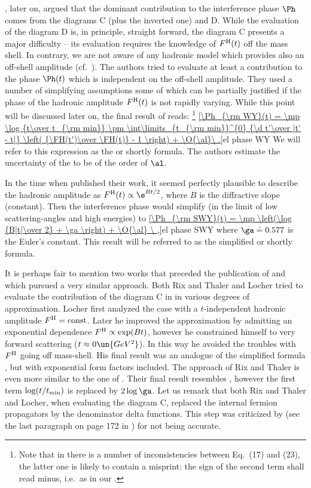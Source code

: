 \WY, later on, argued that the dominant contribution to the interference phase $\Ph$ comes from the diagrams  C (plus the inverted one) and D. While the evaluation of the diagram D is, in principle, straight forward, the diagram C presents a major difficulty -- its evaluation requires the knowledge of $F^{\rm H}(t)$ off the mass shell. In contrary, we are not aware of any hadronic model which provides also an off-shell amplitude (cf.~). The authors tried to evaluate at least a contribution to the phase $\Ph(t)$ which is independent on the off-shell amplitude. They used a number of simplifying assumptions some of which can be partially justified if the phase of the hadronic amplitude $F^{\rm H}(t)$ is not rapidly varying. While this point will be discussed later on, the final result of \WY{} reads: \footnote{%
Note that in  there is a number of inconsistencies between Eq.~(17) and (23), the latter one is likely to contain a misprint: the sign of the second term shall read minus, i.e.~as in our .
}
\eqref{\Ph_{\rm WY}(t) = \mp \log {t\over t_{\rm min}} \pm \int\limits_{t_{\rm min}}^{0} {\d t'\over |t' - t|} \left( {\FH(t')\over \FH(t)} - 1 \right) + \O{\al}\ .}{el phase WY}
We will refer to this expression as the \WY{} or shortly  formula. The authors estimate the uncertainty of the \rhs{} to be of the order of $\al$.

In the time when \WY{} published their work, it seemed perfectly plausible to describe the hadronic amplitude as $\FH(t) \propto \e^{Bt/2}$, where $B$ is the diffractive slope (constant). Then the interference phase would simplify (in the limit of low scattering-angles and high energies) to
\eqref{\Ph_{\rm SWY}(t) = \mp \left(\log {B|t|\over 2} + \ga \right) + \O{\al} \ ,}{el phase SWY}
where $\ga \doteq 0.577$ is the Euler's constant. This result will be referred to as the simplified \WY{} or shortly  formula.

It is perhaps fair to mention two works that preceded the publication of \WaY{}  and which pursued a very similar approach. Both Rix and Thaler  and Locher  tried to evaluate the contribution of the diagram C in  in various degrees of approximation. Locher first analyzed the case with a $t$-independent hadronic amplitude $F^{\rm H}=\hbox{const}$. Later he improved the approximation by admitting an exponential dependence $F^{\rm H} \propto \exp(Bt)$, however he constrained himself to very forward scattering ($t\approx 0\un{GeV^2}$). In this way he avoided the troubles with $F^{\rm H}$ going off mass-shell. His final result was an analogue of the simplified \WaY{} formula , but with exponential form factors included. The approach of Rix and Thaler is even more similar to the one of \WaY. Their final result resembles , however the first term $\log(t/t_{\rm min})$ is replaced by $2\log\ga$. Let us remark that both Rix and Thaler and Locher, when evaluating the diagram C, replaced the internal fermion propagators by the denominator delta functions. This step was criticized by \WaY{} (see the last paragraph on page 172 in ) for not being accurate.



